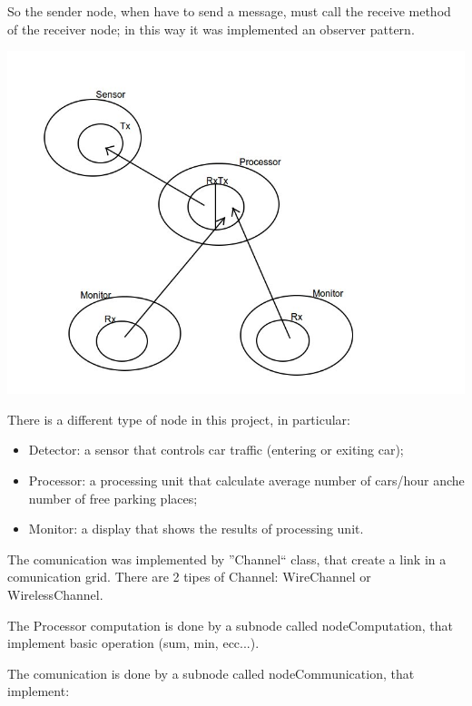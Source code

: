 \documentclass[a4paper,titlepage]{article}
\begin{document}
So the sender node, when have to send a message, must call the receive method of the receiver node; in this way it was implemented an observer pattern.

    \begin{center}

    \centering
    \includegraphics[scale=0.40]{pattern.jpg}

    \end{center}


There is a different type of node in this project, in particular:

\begin{itemize}[noitemsep,topsep=20pt,parsep=10pt,partopsep=20pt]

\item Detector: a sensor that controls car traffic (entering or exiting car); 
\item Processor: a processing unit that calculate average number of cars/hour anche number of free parking places;
\item Monitor: a display that shows the results of processing unit.

\end{itemize}

The comunication was implemented by ''Channel`` class, that create a link in a comunication grid. There are 2 tipes of Channel: WireChannel or WirelessChannel.

The Processor computation is done by a subnode called nodeComputation, that implement basic operation (sum, min, ecc...).

The comunication is done by a subnode called nodeCommunication, that implement:
\end{document}
